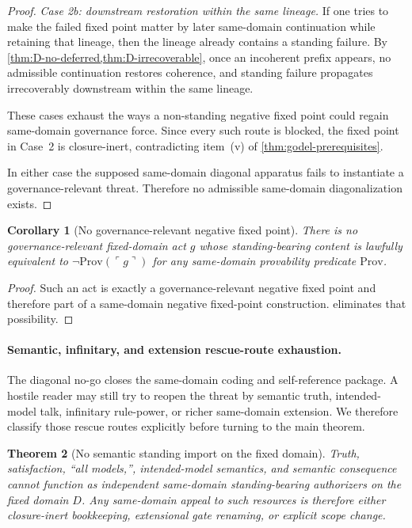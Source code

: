 \documentclass[11pt]{article}
\theoremstyle{plain}
\newtheorem{theorem}{Theorem}[section]
\newtheorem{corollary}[theorem]{Corollary}
\theoremstyle{definition}
\newcommand{\Prov}{\mathrm{Prov}}
\newcommand{\code}[1]{\ulcorner #1 \urcorner}
\newcommand{\domain}{D}
\begin{document}
\begin{proof}
\emph{Case 2b: downstream restoration within the same lineage.} If one tries to make the failed fixed point matter by later same-domain continuation while retaining that lineage, then the lineage already contains a standing failure. By \cref{thm:D-no-deferred,thm:D-irrecoverable}, once an incoherent prefix appears, no admissible continuation restores coherence, and standing failure propagates irrecoverably downstream within the same lineage.

These cases exhaust the ways a non-standing negative fixed point could regain same-domain governance force. Since every such route is blocked, the fixed point in Case~2 is closure-inert, contradicting item~(v) of \cref{thm:godel-prerequisites}.

In either case the supposed same-domain diagonal apparatus fails to instantiate a governance-relevant threat. Therefore no admissible same-domain diagonalization exists.
\end{proof}
\begin{corollary}[No governance-relevant negative fixed point]
\label{cor:no-negative-fixedpoint}
There is no governance-relevant fixed-domain act $g$ whose standing-bearing content is lawfully equivalent to $\neg \Prov(\code{g})$ for any same-domain provability predicate $\Prov$.
\end{corollary}

\begin{proof}
Such an act is exactly a governance-relevant negative fixed point and therefore part of a same-domain negative fixed-point construction.  eliminates that possibility.
\end{proof}

\paragraph{Semantic, infinitary, and extension rescue-route exhaustion.}
The diagonal no-go closes the same-domain coding and self-reference package. A hostile reader may still try to reopen the threat by semantic truth, intended-model talk, infinitary rule-power, or richer same-domain extension. We therefore classify those rescue routes explicitly before turning to the main theorem.

\begin{theorem}[No semantic standing import on the fixed domain]
\label{thm:no-semantic-import}
Truth, satisfaction, ``all models,'', intended-model semantics, and semantic consequence cannot function as independent same-domain standing-bearing authorizers on the fixed domain $\domain$. Any same-domain appeal to such resources is therefore either closure-inert bookkeeping, extensional gate renaming, or explicit scope change.
\end{theorem}
\end{document}

